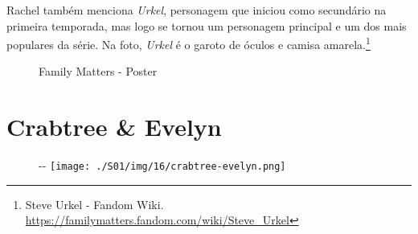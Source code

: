 Rachel também menciona \emph{Urkel}, personagem que iniciou como
secundário na primeira temporada, mas logo se tornou um personagem
principal e um dos mais populares da série. Na foto, \emph{Urkel} é o
garoto de óculos e camisa amarela.\footnote{\sloppy Steve Urkel - Fandom Wiki. \url{https://familymatters.fandom.com/wiki/Steve_Urkel}}

\begin{figure}
  \centering
    \caption{Family Matters - Poster\label{fig:family-matters-poster}}
\end{figure}

\hypertarget{crabtree-evelyn}{%
\section{Crabtree \& Evelyn}\label{crabtree-evelyn}}

\begin{figure}[!ht]
  \begin{adjustwidth}{-\oddsidemargin-1in}{-\rightmargin}
    \centering
    \texttt{[image: ./S01/img/16/crabtree-evelyn.png]}
  \end{adjustwidth}
\end{figure}

